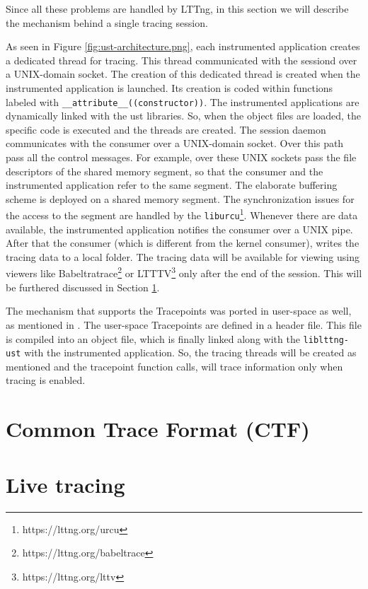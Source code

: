 Since all these problems are handled by LTTng, in this section we will describe
the mechanism behind a single tracing session.


As seen in Figure \ref{fig:ust-architecture.png}, each instrumented application
creates a dedicated thread for tracing. This thread communicated with the
sessiond over a UNIX-domain socket. The creation of this dedicated thread is
created when the instrumented application is launched. Its creation is coded
within functions labeled with \texttt{\_\_attribute\_\_((constructor))}. The
instrumented applications are dynamically linked with the ust libraries. So,
when the object files are loaded, the specific code is executed and the threads
are created. The session daemon communicates with the consumer over a
UNIX-domain socket. Over this path pass all the control messages. For example,
over these UNIX sockets pass the file descriptors of the shared memory segment,
so that the consumer and the instrumented application refer to the same segment.
The elaborate buffering scheme is deployed on a shared memory segment. The
synchronization issues for the access to the segment are handled by the
\texttt{liburcu}\footnote{https://lttng.org/urcu}. Whenever there are data
available, the instrumented application notifies the consumer over a UNIX pipe.
After that the consumer (which is different from the kernel consumer), writes
the tracing data to a local folder. The tracing data will be available for
viewing using viewers like Babeltratrace\footnote{https://lttng.org/babeltrace}
or LTTTV\footnote{https://lttng.org/lttv} only after the end of the session.
This will be furthered discussed in Section \ref{sec:ctf}.

The mechanism that supports the Tracepoints was ported in user-space as well, as
mentioned in \cite{userspace-markers}. The user-space Tracepoints are defined in
a header file. This file is compiled into an object file, which is finally
linked along with the \texttt{liblttng-ust} with the instrumented application.
So, the tracing threads will be created as mentioned and the tracepoint function
calls, will trace information only when tracing is enabled.

\section{Common Trace Format (CTF)}\label{sec:ctf}

\section{Live tracing}\label{sec:relayd}
